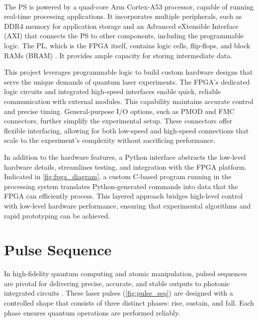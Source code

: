 The PS is powered by a quad-core Arm\textsuperscript{\textregistered} Cortex\textsuperscript{\textregistered}-A53 processor, capable of running real-time processing applications. It incorporates multiple peripherals, such as DDR4 memory for application storage and an Advanced eXtensible Interface (AXI) that connects the PS to other components, including the programmable logic. The PL, which is the FPGA itself, contains logic cells, flip-flops, and block RAMs (BRAM) \cite{XilinxUG1182}. It provides ample capacity for storing intermediate data.

This project leverages programmable logic to build custom hardware designs that serve the unique demands of quantum laser experiments. The FPGA's dedicated logic circuits and integrated high-speed interfaces enable quick, reliable communication with external modules. This capability maintains accurate control and precise timing. General-purpose I/O options, such as PMOD and FMC connectors, further simplify the experimental setup. These connectors offer flexible interfacing, allowing for both low-speed and high-speed connections that scale to the experiment's complexity without sacrificing performance.

In addition to the hardware features, a Python interface abstracts the low-level hardware details, streamlines testing, and integration with the FPGA platform. Indicated in \autoref{fig:fpga_diagram}, a custom C-based program running in the processing system translates Python-generated commands into data that the FPGA can efficiently process. This layered approach bridges high-level control with low-level hardware performance, ensuring that experimental algorithms and rapid prototyping can be achieved.

\section{Pulse Sequence}\label{sec:hw_pulse}

In high-fidelity quantum computing and atomic manipulation, pulsed sequences are pivotal for delivering precise, accurate, and stable outputs to photonic integrated circuits \cite{apic}. These laser pulses (\autoref{fig:pulse_seq}) are designed with a controlled shape that consists of three distinct phases: rise, sustain, and fall. Each phase ensures quantum operations are performed reliably.

